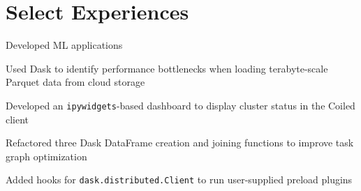 %
%

%
%

%
%


\section{Select Experiences}
\begin{tightemize}
\item Developed ML applications
\end{tightemize}
\sectionsep


\begin{tightemize}
\item Used Dask to identify performance bottlenecks when loading terabyte-scale Parquet data from cloud storage
\item Developed an \verb|ipywidgets|-based dashboard to display cluster status in the Coiled client
\item Refactored three Dask DataFrame creation and joining functions to improve task graph optimization
\item Added hooks for \verb|dask.distributed.Client| to run user-supplied preload plugins
\end{tightemize}

